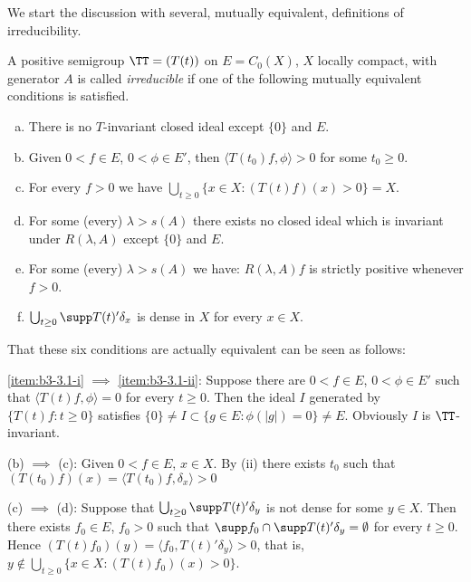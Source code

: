 We start the discussion with several, mutually equivalent, definitions of irreducibility. 

\begin{definition}\label{def:b3-3.1}
A positive semigroup $\TT = (T(t))$ on $E = C_{0}(X)$, $X$ locally compact, with generator $A$ is called \emph{irreducible} if one of the following mutually equivalent conditions is satisfied.
\begin{enumerate}[(a)]

\item\label{item:b3-3.1-i}
There is no $T$-invariant closed ideal except $\{0\}$ and $E$.
	
\item\label{item:b3-3.1-ii}
Given $0 < f \in E$, $0 < \phi \in E'$, then $\langle T(t_{0})f,\phi \rangle > 0$ for some $t_{0} \geq 0$.
	
\item
For every $f > 0$ we have $\bigcup_{t \geq 0}\{x \in X : (T(t)f)(x) > 0\} = X$.
	
\item
For some (every) $\lambda > s(A)$ there exists no closed ideal which is invariant under $R(\lambda,A)$ except $\{0\}$ and $E$.
	
\item
For some (every) $\lambda > s(A)$ we have: $R(\lambda,A)f$ is strictly positive whenever $f > 0$.
	
\item
$\bigcup_{t \geq 0}\supp T(t)'\delta_{x}$ is dense in $X$ for every $x \in X$.

\end{enumerate}
\end{definition}
That these six conditions are actually equivalent can be seen as follows:

\ref{item:b3-3.1-i} $\implies$ \ref{item:b3-3.1-ii}: Suppose there are $0 < f \in E$, $0 < \phi \in E'$ such that $\langle T(t)f,\phi \rangle = 0$ for every $t \geq 0$.
Then the ideal $I$ generated by $\{T(t)f : t \geq 0\}$ satisfies $\{0\} \neq I \subset \{g \in E : \phi(|g|) = 0\} \neq E$.
Obviously $I$ is $\TT$-invariant.

(b) $\implies$ (c): Given $0 < f \in E$, $x \in X$.
By (ii) there exists $t_{0}$ such that $(T(t_{0})f)(x) = \langle T(t_{0})f,\delta_{x} \rangle > 0$

(c) $\implies$ (d): Suppose that $\bigcup_{t \geq 0}\supp T(t)'\delta_{y}$ is not dense for some $y \in X$.
Then there exists $f_{0} \in E$, $f_{0} > 0$ such that 
$\supp f_{0} \cap \supp T(t)'\delta_{y} = \emptyset$ for every $t \geq 0$.
Hence $(T(t)f_{0})(y) = \langle f_{0},T(t)'\delta_{y} \rangle > 0$, that is, $y \notin \bigcup_{t\geq 0}\{x \in X : (T(t)f_{0})(x) > 0\}$.

